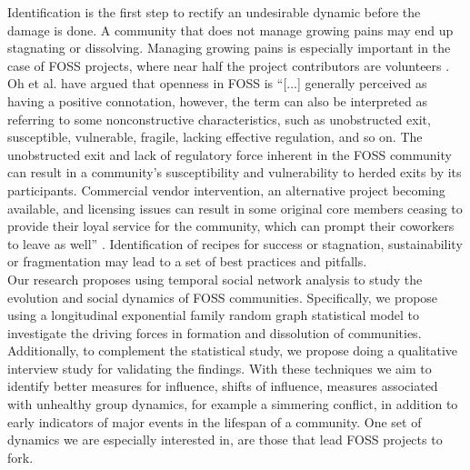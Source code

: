 \documentclass[11pt]{report}
\begin{document}
Identification is the first step to rectify an undesirable dynamic before the damage is done. A community that does not manage growing pains may end up stagnating or dissolving. Managing growing pains is especially important in the case of FOSS projects, where near half the project contributors are volunteers \cite{Forrest}. Oh et al. \cite{Oh} have argued that openness in FOSS is ``[...] generally perceived as having a positive connotation, however, the term can also be interpreted as referring to some nonconstructive characteristics, such as unobstructed exit, susceptible, vulnerable, fragile, lacking effective regulation, and so on. The unobstructed exit and lack of regulatory force inherent in the FOSS community can result in a community's susceptibility and vulnerability to herded exits by its participants. Commercial vendor intervention, an alternative project becoming available, and licensing issues can result in some original core members ceasing to provide their loyal service for the community, which can prompt their coworkers to leave as well'' \cite{Oh}. Identification of recipes for success or stagnation, sustainability or fragmentation may lead to a set of best practices and pitfalls.\\

Our research proposes using temporal social network analysis to study the evolution and social dynamics of FOSS communities. Specifically, we propose using a longitudinal exponential family random graph statistical model to investigate the driving forces in formation and dissolution of communities. Additionally,  to complement the statistical study, we propose doing a qualitative interview study for validating the findings. With these techniques we aim to identify better measures for influence, shifts of influence, measures associated with unhealthy group dynamics, for example a simmering conflict, in addition to early indicators of major events in the lifespan of a community. One set of dynamics we are especially interested in, are those that lead FOSS projects to fork.\\
\end{document}
